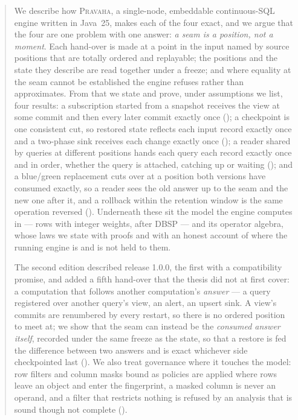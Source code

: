 \documentclass[11pt,a4paper]{article}
\renewcommand{\_}{\oldunderscore\allowbreak}
\newcommand{\Pv}{\textsc{Pravaha}}
\begin{document}
\begin{abstract}
We describe how \Pv, a single-node, embeddable continuous-SQL engine written in Java~25, makes each
of the four exact, and we argue that the four are one problem with one answer: \emph{a seam is a
position, not a moment}. Each hand-over is made at a point in the input named by source positions
that are totally ordered and replayable; the positions and the state they describe are read together
under a freeze; and where equality at the seam cannot be established the engine refuses rather than
approximates. From that we state and prove, under assumptions we list, four results: a subscription
started from a snapshot receives the view at some commit and then every later commit exactly once
(); a checkpoint is one consistent cut, so restored state reflects each input
record exactly once and a two-phase sink receives each change exactly once ();
a reader shared by queries at different positions hands each query each record exactly once and in
order, whether the query is attached, catching up or waiting (); and a blue/green
replacement cuts over at a position both versions have consumed exactly, so a reader sees the old
answer up to the seam and the new one after it, and a rollback within the retention window is the
same operation reversed (). Underneath these sit the model the engine computes
in --- rows with integer weights, after DBSP --- and its operator algebra, whose laws we state with
proofs and with an honest account of where the running engine is and is not held to them.

The second edition described release 1.0.0, the first with a compatibility promise, and added a fifth
hand-over that the thesis did not at first cover: a computation that follows another computation's
\emph{answer} --- a query registered over another query's view, an alert, an upsert sink. A view's
commits are renumbered by every restart, so there is no ordered position to meet at; we show that the
seam can instead be the \emph{consumed answer itself}, recorded under the same freeze as the state, so
that a restore is fed the difference between two answers and is exact whichever side checkpointed last
(). We also treat governance where it touches the model: row filters and column masks
bound as policies are applied where rows leave an object and enter the fingerprint, a masked column is
never an operand, and a filter that restricts nothing is refused by an analysis that is sound though not
complete ().


\end{abstract}
\end{document}
